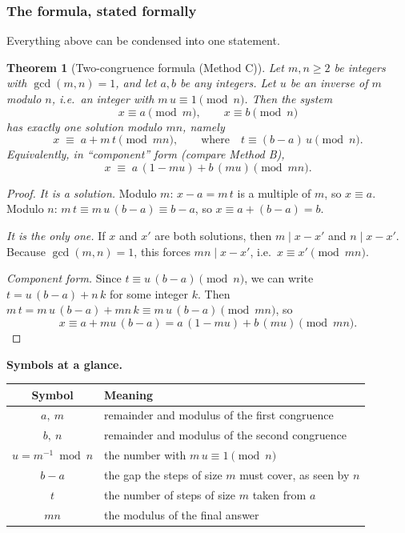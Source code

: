 \documentclass[11pt]{article}
\newtheorem{theorem}{Theorem}[section]
\theoremstyle{definition}
\theoremstyle{remark}
\begin{document}
\subsubsection*{The formula, stated formally}

Everything above can be condensed into one statement.

\begin{theorem}[Two-congruence formula (Method C)]\label{thm:methodC}
Let $m,n\ge 2$ be integers with $\gcd(m,n)=1$, and let $a,b$ be any integers. Let $u$ be an inverse of $m$ modulo $n$, i.e.\ an integer with $m\,u\equiv1\pmod n$. Then the system
\[
x\equiv a\pmod m,\qquad x\equiv b\pmod n
\]
has exactly one solution modulo $mn$, namely
\[
\boxed{\;x\;\equiv\;a+m\,t \pmod{mn},\qquad\text{where}\quad t\equiv (b-a)\,u \pmod n.\;}
\]
Equivalently, in ``component'' form (compare Method B),
\[
x\;\equiv\;a\,(1-mu)+b\,(mu)\pmod{mn}.
\]
\end{theorem}

\begin{proof}
\emph{It is a solution.} Modulo $m$: $x-a=m\,t$ is a multiple of $m$, so $x\equiv a$. Modulo $n$: $m\,t\equiv m\,u\,(b-a)\equiv b-a$, so $x\equiv a+(b-a)=b$.

\emph{It is the only one.} If $x$ and $x'$ are both solutions, then $m\mid x-x'$ and $n\mid x-x'$. Because $\gcd(m,n)=1$, this forces $mn\mid x-x'$, i.e.\ $x\equiv x'\pmod{mn}$.

\emph{Component form.} Since $t\equiv u\,(b-a)\pmod n$, we can write $t=u\,(b-a)+n\,k$ for some integer $k$. Then $m\,t=m\,u\,(b-a)+mn\,k\equiv m\,u\,(b-a)\pmod{mn}$, so
\[
x\equiv a+mu\,(b-a)=a\,(1-mu)+b\,(mu)\pmod{mn}.
\]
\end{proof}

\noindent\textbf{Symbols at a glance.}
\begin{center}
\renewcommand{\arraystretch}{1.3}
\begin{tabular}{cl}
\toprule
Symbol & Meaning \\
\midrule
$a,\ m$ & remainder and modulus of the first congruence \\
$b,\ n$ & remainder and modulus of the second congruence \\
$u=m^{-1}\bmod n$ & the number with $m\,u\equiv1\pmod n$ \\
$b-a$ & the gap the steps of size $m$ must cover, as seen by $n$ \\
$t$ & the number of steps of size $m$ taken from $a$ \\
$mn$ & the modulus of the final answer \\
\bottomrule
\end{tabular}
\end{center}
\end{document}
